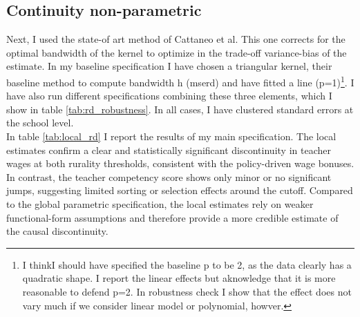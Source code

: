 \documentclass{article}
\begin{document}
\subsection*{Continuity non-parametric}

Next, I used the state-of art method of Cattaneo et al. This one corrects for the optimal bandwidth of the kernel to optimize in the trade-off variance-bias of the estimate. In my baseline specification I have chosen a triangular kernel, their baseline method to compute bandwidth h (mserd) and have fitted a line (p=1)\footnote{I thinkI should have specified the baseline p to be 2, as the data clearly has a quadratic shape. I report the linear effects but aknowledge that it is more reasonable to defend p=2. In robustness check I show that the effect does not vary much if we consider linear model or polynomial, howver.}. I have also run different specifications combining these three elements, which I show in table \ref{tab:rd_robustness}. In all cases, I have clustered standard errors at the school level. \\

In table \ref{tab:local_rd} I report the results of my main specification. The local estimates confirm a clear and statistically significant discontinuity in teacher wages at both rurality thresholds, consistent with the policy-driven wage bonuses. In contrast, the teacher competency score shows only minor or no significant jumps, suggesting limited sorting or selection effects around the cutoff. Compared to the global parametric specification, the local estimates rely on weaker functional-form assumptions and therefore provide a more credible estimate of the causal discontinuity. \\
\end{document}
